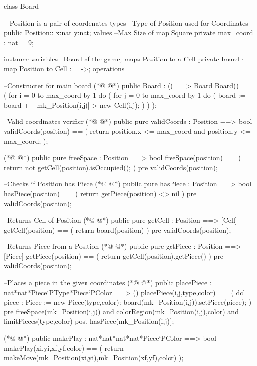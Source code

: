 \begin{vdmpp}[breaklines=true]
class Board

-- Position is a pair of coordenates
types
  --Type of Position used for Coordinates
  public Position:: x:nat  y:nat;
values
  --Max Size of map Square
  private max_coord : nat = 9;
  
instance variables
 --Board of the game, maps Position to a Cell
 private board : map Position to Cell := {|->};
operations

  --Constructer for main board
(*@
\label{Board:17}
@*)
  public Board : () ==> Board
   Board() ==
   (
    for i = 0 to max_coord by 1 do
    (
     for j = 0 to max_coord by 1 do
     (
       board := board ++ {mk_Position(i,j)|-> new Cell(i,j)};
     )
    )
  );

 --Valid coordinates verifier
(*@
\label{validCoords:30}
@*)
  public pure validCoords : Position ==> bool
  validCoords(position) ==
  (
   return position.x <= max_coord and position.y <= max_coord;
  );
  
(*@
\label{freeSpace:36}
@*)
  public pure freeSpace : Position ==> bool
  freeSpace(position) == 
  (
   return not getCell(position).isOccupied();
  )
  pre validCoords(position);
  
  --Checks if Position has Piece
(*@
\label{hasPiece:44}
@*)
  public pure hasPiece : Position ==> bool
  hasPiece(position) == 
  (
  return getPiece(position) <> nil
  )
 pre validCoords(position);
  
  --Returns Cell of Position
(*@
\label{getCell:52}
@*)
  public pure getCell : Position ==> [Cell]
  getCell(position) == 
  (
  return board(position)
  )
  pre validCoords(position);
  
  --Returns Piece from a Position
(*@
\label{getPiece:60}
@*)
  public pure getPiece : Position ==> [Piece]
  getPiece(position) == 
  (
  return getCell(position).getPiece()
  )
  pre validCoords(position);
  
  --Places a piece in the given coordinates
(*@
\label{placePiece:68}
@*)
  public placePiece : nat*nat*Piece`PType*Piece`PColor ==> ()
  placePiece(i,j,type,color) == 
  (
   dcl piece : Piece := new Piece(type,color);
   board(mk_Position(i,j)).setPiece(piece);
  )
  pre freeSpace(mk_Position(i,j)) and colorRegion(mk_Position(i,j),color) and limitPieces(type,color)
  post hasPiece(mk_Position(i,j));
  
(*@
\label{makePlay:77}
@*)
  public makePlay : nat*nat*nat*nat*Piece`PColor ==> bool
  makePlay(xi,yi,xf,yf,color) == 
  (
   return makeMove(mk_Position(xi,yi),mk_Position(xf,yf),color)
  );
  

\end{vdmpp}
